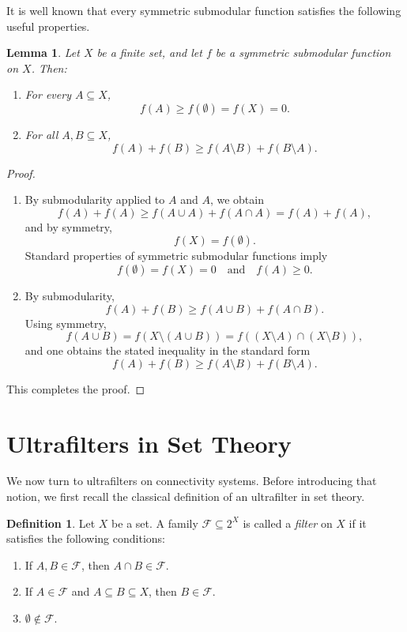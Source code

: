 \documentclass[10pt]{book}
\newtheorem{lemma}[theorem]{Lemma}
\theoremstyle{definition}
\newtheorem{definition}[theorem]{Definition}
\begin{document}
It is well known that every symmetric submodular function satisfies the following useful properties.

\begin{lemma}\cite{9}
Let \(X\) be a finite set, and let \(f\) be a symmetric submodular function on \(X\). Then:
\begin{enumerate}
    \item For every \(A\subseteq X\),
    \[
    f(A)\geq f(\emptyset)=f(X)=0.
    \]
    \item For all \(A,B\subseteq X\),
    \[
    f(A)+f(B)\geq f(A\setminus B)+f(B\setminus A).
    \]
\end{enumerate}
\end{lemma}

\begin{proof}
\begin{enumerate}
    \item By submodularity applied to \(A\) and \(A\), we obtain
    \[
    f(A)+f(A)\geq f(A\cup A)+f(A\cap A)=f(A)+f(A),
    \]
    and by symmetry,
    \[
    f(X)=f(\emptyset).
    \]
    Standard properties of symmetric submodular functions imply
    \[
    f(\emptyset)=f(X)=0
    \quad\text{and}\quad
    f(A)\geq 0.
    \]

    \item By submodularity,
    \[
    f(A)+f(B)\geq f(A\cup B)+f(A\cap B).
    \]
    Using symmetry,
    \[
    f(A\cup B)=f(X\setminus (A\cup B))=f((X\setminus A)\cap (X\setminus B)),
    \]
    and one obtains the stated inequality in the standard form
    \[
    f(A)+f(B)\geq f(A\setminus B)+f(B\setminus A).
    \]
\end{enumerate}
This completes the proof.
\end{proof}

\section{Ultrafilters in Set Theory}
We now turn to ultrafilters on connectivity systems.  
Before introducing that notion, we first recall the classical definition of an ultrafilter in set theory.

\begin{definition}
Let \(X\) be a set. A family \(\mathcal{F}\subseteq 2^X\) is called a \emph{filter} on \(X\) if it satisfies the following conditions:
\begin{enumerate}
    \item[(BF1)] If \(A,B\in\mathcal{F}\), then \(A\cap B\in\mathcal{F}\).
    \item[(BF2)] If \(A\in\mathcal{F}\) and \(A\subseteq B\subseteq X\), then \(B\in\mathcal{F}\).
    \item[(BF3)] \(\emptyset\notin\mathcal{F}\).
\end{enumerate}
\end{definition}
\end{document}
